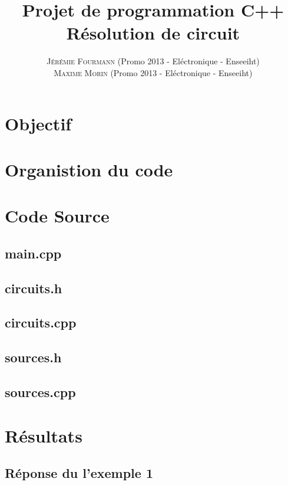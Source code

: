 \documentclass[a4paper,11pt]{article}
\title{\textbf{ \huge{Projet de programmation C++}} \\{\Large  Résolution de circuit}}
\author{
\textsc{Jérémie Fourmann} (Promo 2013 - Eléctronique - Enseeiht)\\ %
\textsc{Maxime Morin} (Promo 2013 - Eléctronique - Enseeiht)\\ %
}
\begin{document}
\pagestyle{plain}

\maketitle
\vspace{1cm}
\renewcommand{\contentsname}{Plan}
\tableofcontents
\vspace{2cm}



\newpage



\section{Objectif}
\section{Organistion du code}

\section{Code Source}
  \subsection{main.cpp}
    
    \newpage
  \subsection{circuits.h}
    
    \newpage
  \subsection{circuits.cpp}
    
    \newpage
   \subsection{sources.h}
    
    \newpage
   \subsection{sources.cpp}
    
    \newpage

\section{Résultats}
  \subsection{Réponse du l'exemple 1}
\end{document}
